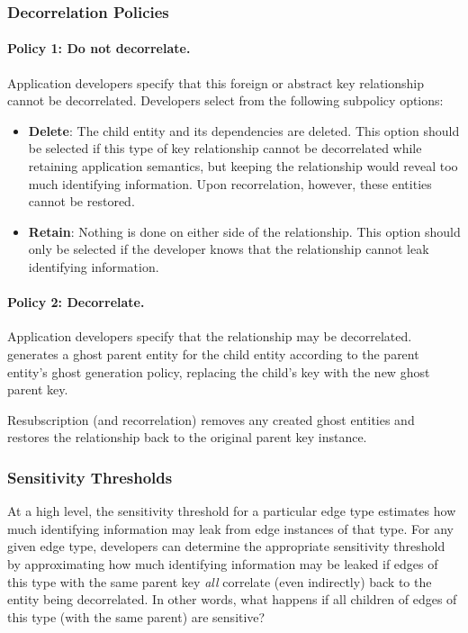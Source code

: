 \subsubsection{Decorrelation Policies}

\paragraph{Policy 1: Do not decorrelate.}
Application developers specify that this foreign or abstract key relationship cannot be decorrelated.
Developers select from the following subpolicy options: 
\begin{itemize}
    \item \textbf{Delete}: The child entity and its dependencies are deleted. This option should be
        selected if this type of key relationship cannot be decorrelated while retaining application
        semantics, but keeping the relationship would reveal too much identifying information.
        Upon recorrelation, however, these entities cannot be restored.

    \item \textbf{Retain}: Nothing is done on either side of the
        relationship. This option should only be selected if the developer knows that the
        relationship cannot leak identifying information.
   \end{itemize}

\paragraph{Policy 2: Decorrelate.}
Application developers specify that the relationship may be decorrelated.
\sys{} generates a ghost parent entity for the child entity according to the parent entity's ghost
generation policy, replacing the child's key with the new ghost parent key.

Resubscription (and recorrelation) removes any created ghost entities and restores the relationship
back to the original parent key instance.


\subsubsection{Sensitivity Thresholds}
At a high level, the sensitivity threshold for a particular edge type estimates how much identifying
information may leak from edge instances of that type.  For any given edge type, developers can
determine the appropriate sensitivity threshold by approximating how much identifying information
may be leaked if edges of this type with the same parent key \emph{all} correlate (even indirectly)
back to the entity being decorrelated. In other words, what happens if all children of edges of this
type (with the same parent) are sensitive?

